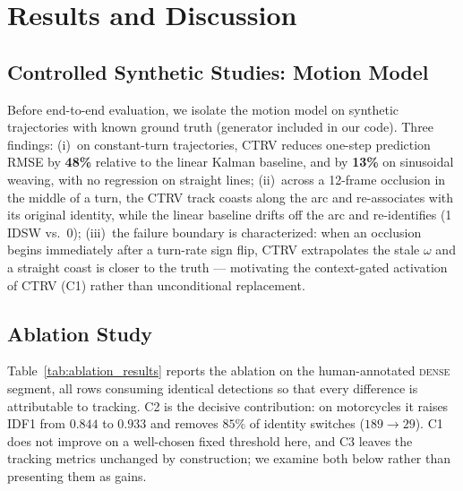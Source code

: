 
\section{Results and Discussion}
\label{sec:results}

\subsection{Controlled Synthetic Studies: Motion Model}
\label{subsec:synthetic}

Before end-to-end evaluation, we isolate the motion model on synthetic
trajectories with known ground truth (generator included in our code).
Three findings:
(i)~on constant-turn trajectories, CTRV reduces one-step prediction
RMSE by \textbf{48\%} relative to the linear Kalman baseline, and by
\textbf{13\%} on sinusoidal weaving, with no regression on straight
lines;
(ii)~across a 12-frame occlusion in the middle of a turn, the CTRV
track coasts along the arc and re-associates with its original
identity, while the linear baseline drifts off the arc and
re-identifies (1 IDSW vs.\ 0);
(iii)~the failure boundary is characterized: when an occlusion begins
immediately after a turn-rate sign flip, CTRV extrapolates the stale
$\omega$ and a straight coast is closer to the truth --- motivating the
context-gated activation of CTRV (C1) rather than unconditional
replacement.

\subsection{Ablation Study}
\label{subsec:ablation_results}

Table~\ref{tab:ablation_results} reports the ablation on the
human-annotated \textsc{dense} segment, all rows consuming identical
detections so that every difference is attributable to tracking.
C2 is the decisive contribution: on motorcycles it raises IDF1 from
$0.844$ to $0.933$ and removes $85\%$ of identity switches
($189 \rightarrow 29$).
C1 does not improve on a well-chosen fixed threshold here, and C3 leaves
the tracking metrics unchanged by construction; we examine both below
rather than presenting them as gains.

